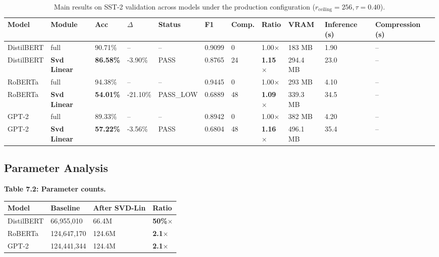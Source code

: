 \begin{table}[t]
\centering
\small
\begin{tabular}{lllllllllll}
\toprule
\textbf{Model} & \textbf{Module} & \textbf{Acc} & \textbf{$\Delta$} & \textbf{Status} & \textbf{F1} & \textbf{Comp.} & \textbf{Ratio} & \textbf{VRAM} & \textbf{Inference (s)} & \textbf{Compression (s)} \\
\midrule
DistilBERT & full & 90.71\% & -- & -- & 0.9099 & 0 & 1.00$\times$ & 183 MB & 1.90 & -- \\
DistilBERT & \textbf{Svd Linear} & \textbf{86.58\%} & -3.90\% & PASS & 0.8765 & 24 & \textbf{1.15$\times$} & 294.4 MB & 23.0 & -- \\
RoBERTa & full & 94.38\% & -- & -- & 0.9445 & 0 & 1.00$\times$ & 293 MB & 4.10 & -- \\
RoBERTa & \textbf{Svd Linear} & \textbf{54.01\%} & -21.10\% & PASS\_LOW & 0.6889 & 48 & \textbf{1.09$\times$} & 339.3 MB & 34.5 & -- \\
GPT-2 & full & 89.33\% & -- & -- & 0.8942 & 0 & 1.00$\times$ & 382 MB & 4.20 & -- \\
GPT-2 & \textbf{Svd Linear} & \textbf{57.22\%} & -3.56\% & PASS & 0.6804 & 48 & \textbf{1.16$\times$} & 496.1 MB & 35.4 & -- \\
\bottomrule
\end{tabular}
\caption{Main results on SST-2 validation across models under the production configuration ($r_{\mathrm{ceiling}}=256, \tau=0.40$).}
\label{tab:main_sst2}
\end{table}

\subsection{Parameter Analysis}

\textbf{Table 7.2: Parameter counts.}

\begin{table}[H]
\centering
\small
\begin{tabular}{llll}
\toprule
\textbf{Model} & \textbf{Baseline} & \textbf{After SVD-Lin} & \textbf{Ratio} \\
\midrule
DistilBERT & 66,955,010 & 66.4M & \textbf{50\%$\times$} \\
RoBERTa & 124,647,170 & 124.6M & \textbf{2.1$\times$} \\
GPT-2 & 124,441,344 & 124.4M & \textbf{2.1$\times$} \\
\bottomrule
\end{tabular}
\end{table}

